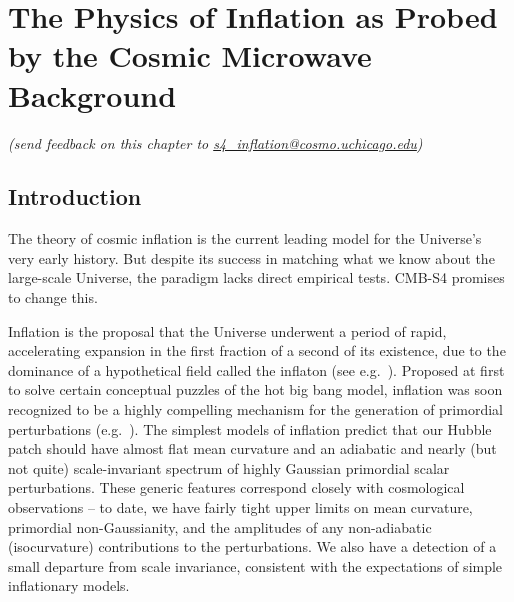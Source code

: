  
\chapter{The Physics of Inflation as Probed by the Cosmic Microwave Background}



\begin{center}
{\small {\it (send feedback on this chapter to \href{mailto:s4\_inflation@cosmo.uchicago.edu}{s4\_inflation@cosmo.uchicago.edu})}}
\end{center}



\section{Introduction}

The theory of cosmic inflation is the current leading model for the Universe's
very early history.  But despite its success in matching what we know about the
large-scale Universe, the paradigm
lacks direct empirical tests.  CMB-S4 promises to change this.

Inflation is the proposal that the Universe underwent a period of rapid,
accelerating expansion in the first fraction of a second of its existence,
due to the dominance of a hypothetical field called the inflaton
(see e.g.\ \cite{EllisWands}).
Proposed at first to solve certain conceptual puzzles of the hot big bang
model, inflation was soon recognized to be a highly compelling mechanism for
the generation of primordial perturbations
(e.g.\ \cite{AbbottPi,Linde:2005ht,LemoineMartinPeter}).
The simplest models of inflation predict that our Hubble patch should have
almost flat mean curvature and an adiabatic and nearly (but not quite)
scale-invariant spectrum of highly Gaussian primordial scalar perturbations.
These generic features correspond closely with cosmological observations --
to date, we have fairly tight upper limits on mean curvature, primordial
non-Gaussianity, and the amplitudes of any non-adiabatic (isocurvature)
contributions to the perturbations. We also have a detection of a small
departure from scale invariance, consistent with the expectations of simple
inflationary models.


